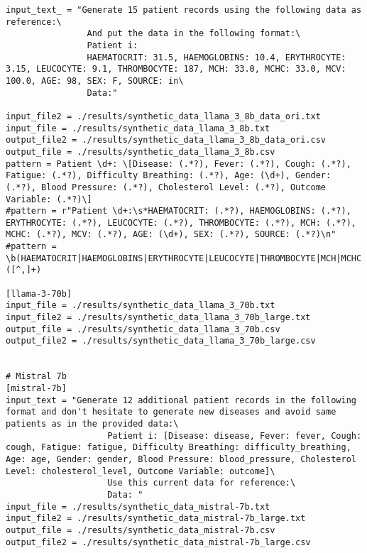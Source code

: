 \begin{verbatim}
input_text_ = "Generate 15 patient records using the following data as reference:\
                And put the data in the following format:\
                Patient i:
                HAEMATOCRIT: 31.5, HAEMOGLOBINS: 10.4, ERYTHROCYTE: 3.15, LEUCOCYTE: 9.1, THROMBOCYTE: 187, MCH: 33.0, MCHC: 33.0, MCV: 100.0, AGE: 98, SEX: F, SOURCE: in\
                Data:"

input_file2 = ./results/synthetic_data_llama_3_8b_data_ori.txt
input_file = ./results/synthetic_data_llama_3_8b.txt
output_file2 = ./results/synthetic_data_llama_3_8b_data_ori.csv
output_file = ./results/synthetic_data_llama_3_8b.csv
pattern = Patient \d+: \[Disease: (.*?), Fever: (.*?), Cough: (.*?), Fatigue: (.*?), Difficulty Breathing: (.*?), Age: (\d+), Gender: (.*?), Blood Pressure: (.*?), Cholesterol Level: (.*?), Outcome Variable: (.*?)\]
#pattern = r"Patient \d+:\s*HAEMATOCRIT: (.*?), HAEMOGLOBINS: (.*?), ERYTHROCYTE: (.*?), LEUCOCYTE: (.*?), THROMBOCYTE: (.*?), MCH: (.*?), MCHC: (.*?), MCV: (.*?), AGE: (\d+), SEX: (.*?), SOURCE: (.*?)\n"
#pattern = \b(HAEMATOCRIT|HAEMOGLOBINS|ERYTHROCYTE|LEUCOCYTE|THROMBOCYTE|MCH|MCHC|MCV|AGE|SEX|SOURCE):\s*([^,]+)

[llama-3-70b]
input_file = ./results/synthetic_data_llama_3_70b.txt
input_file2 = ./results/synthetic_data_llama_3_70b_large.txt
output_file = ./results/synthetic_data_llama_3_70b.csv
output_file2 = ./results/synthetic_data_llama_3_70b_large.csv


# Mistral 7b
[mistral-7b]
input_text = "Generate 12 additional patient records in the following format and don't hesitate to generate new diseases and avoid same patients as in the provided data:\
                    Patient i: [Disease: disease, Fever: fever, Cough: cough, Fatigue: fatigue, Difficulty Breathing: difficulty_breathing, Age: age, Gender: gender, Blood Pressure: blood_pressure, Cholesterol Level: cholesterol_level, Outcome Variable: outcome]\
                    Use this current data for reference:\
                    Data: "
input_file = ./results/synthetic_data_mistral-7b.txt
input_file2 = ./results/synthetic_data_mistral-7b_large.txt
output_file = ./results/synthetic_data_mistral-7b.csv
output_file2 = ./results/synthetic_data_mistral-7b_large.csv



\end{verbatim}